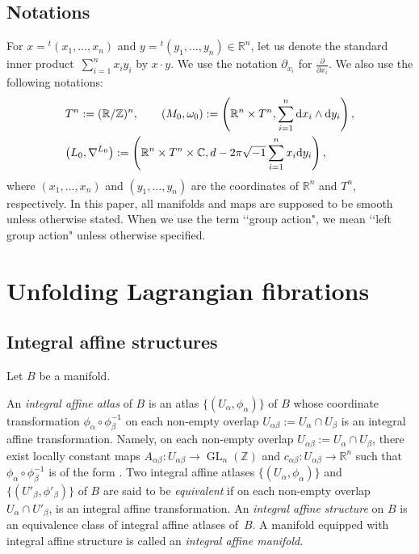 \documentclass[10pt,a4paper]{amsart}
\numberwithin{equation}{section}
\newcommand{\C}{\mathbb{C}}
\newcommand{\R}{\mathbb{R}}
\newcommand{\Z}{\mathbb{Z}}
\def\GL{\operatorname{GL}}
\begin{document}
\subsection{Notations}
For $x={}^t(x_1, \ldots ,x_n)$ and $y={}^t(y_1, \ldots ,y_n)\in \R^n$, let us denote the standard inner product~${\sum_{i=1}^nx_iy_i}$ by $x\cdot y$. We use the notation $\partial_{x_i}$ for $\frac{\partial}{\partial x_i}$. We also use the following notations:
\begin{align*}
&T^n:=(\R/\Z)^n, \qquad
(M_0, \omega_0):=\left( \R^n\times T^n, \sum_{i=1}^n{\rm d}x_i\wedge {\rm d}y_i\right),\\
&\bigl( L_0, \nabla^{L_0}\bigr):=\left(\R^n\times T^n\times \C , d-2\pi\sqrt{-1}\sum_{i=1}^nx_i {\rm d}y_i\right),
\end{align*}
where $(x_1,\ldots ,x_n)$ and $(y_1,\ldots ,y_n)$ are the coordinates of $\R^n$ and $T^n$, respectively. %
In this paper, all manifolds and maps are supposed to be smooth unless otherwise stated. When we use the term \lq\lq group action", we mean \lq\lq left group action" unless otherwise specified.


\section{Unfolding Lagrangian fibrations}\label{Developing Lagrangian fibration}
\subsection{Integral affine structures}
Let $B$ be a manifold.
\begin{Definition}\label{def integral affine structure}
An \emph{integral affine atlas} of $B$ is an atlas $\{ (U_\alpha,\phi_\alpha)\}$ of $B$ whose coordinate transformation $\phi_\alpha\circ \phi_\beta^{-1}$ on each non-empty overlap $U_{\alpha\beta}:=U_\alpha \cap U_\beta$ is an integral affine transformation. Namely, on each non-empty overlap $U_{\alpha\beta}:=U_\alpha \cap U_\beta$, there exist locally constant maps $A_{\alpha\beta}\colon U_{\alpha\beta}\to \GL_n(\Z)$ and $c_{\alpha\beta}\colon U_{\alpha\beta}\to \R^n$ such that $\phi_\alpha\circ \phi_\beta^{-1}$ is of the form .
Two integral affine atlases $\{ (U_\alpha, \phi_\alpha)\}$ and $\{ (U'_\beta ,\phi'_\beta)\}$ of $B$ are said to be \emph{equivalent} if on each non-empty overlap $U_\alpha\cap U'_\beta$,  is an integral affine transformation.
An \emph{integral affine structure} on $B$ is an equivalence class of integral affine atlases of~$B$. A manifold equipped with integral affine structure is called an \emph{integral affine manifold}.
\end{Definition}
\end{document}
